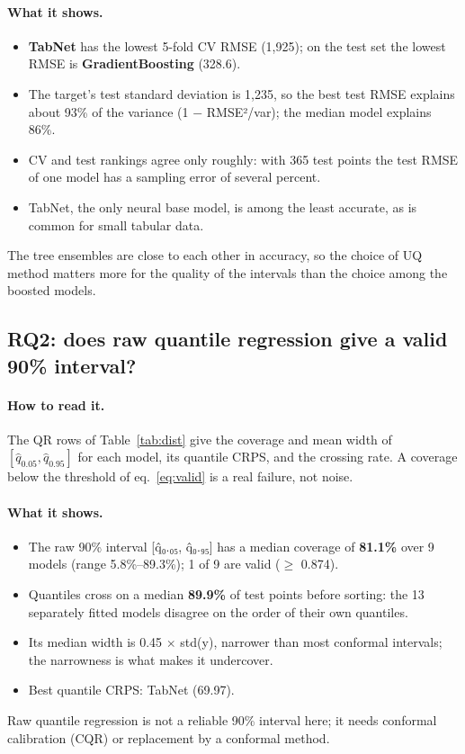 \documentclass[11pt]{article}
\begin{document}
\paragraph{What it shows.}
\begin{itemize}
\item \textbf{TabNet} has the lowest 5-fold CV RMSE (1,925); on the test set the lowest RMSE is \textbf{GradientBoosting} (328.6).
\item The target's test standard deviation is 1,235, so the best test RMSE explains about 93\% of the variance (1 $-$ RMSE²/var); the median model explains 86\%.
\item CV and test rankings agree only roughly: with 365 test points the test RMSE of one model has a sampling error of several percent.
\item TabNet, the only neural base model, is among the least accurate, as is common for small tabular data.
\end{itemize}
\begin{insight}[Takeaway RQ1]
The tree ensembles are close to each other in accuracy, so the choice of UQ method matters more for the quality of the intervals than the choice among the boosted models.
\end{insight}

\subsection{RQ2: does raw quantile regression give a valid 90\% interval?}
\paragraph{How to read it.} The QR rows of Table~\ref{tab:dist} give the coverage and mean width of $[\hat q_{0.05},\hat q_{0.95}]$ for each model, its quantile CRPS, and the crossing rate. A coverage below the threshold of eq.~\eqref{eq:valid} is a real failure, not noise.
\paragraph{What it shows.}
\begin{itemize}
\item The raw 90\% interval [q̂₀.₀₅, q̂₀.₉₅] has a median coverage of \textbf{81.1\%} over 9 models (range 5.8\%--89.3\%); 1 of 9 are valid ($\geq$ 0.874).
\item Quantiles cross on a median \textbf{89.9\%} of test points before sorting: the 13 separately fitted models disagree on the order of their own quantiles.
\item Its median width is 0.45 $\times$ std(y), narrower than most conformal intervals; the narrowness is what makes it undercover.
\item Best quantile CRPS: TabNet (69.97).
\end{itemize}
\begin{insight}[Takeaway RQ2]
Raw quantile regression is not a reliable 90\% interval here; it needs conformal calibration (CQR) or replacement by a conformal method.
\end{insight}
\end{document}
